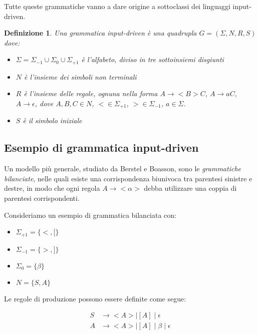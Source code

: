 \documentclass[a4paper,12pt]{report}
\newtheorem{definition}{Definizione}[chapter]
\theoremstyle{propositionstyle}
\begin{document}
    Tutte queste grammatiche vanno a dare origine a sottoclassi dei linguaggi input-driven.

    \begin{definition}
        Una grammatica input-driven è una quadrupla $G = \left(\Sigma, N, R, S\right)$ dove:
        \begin{itemize}
            \item $\Sigma = \Sigma_{-1} \cup \Sigma_0 \cup \Sigma_{+1}$ è l'alfabeto, diviso in tre sottoinsiemi disgiunti
            \item $N$ è l'insieme dei simboli non terminali
            \item $R$ è l'insieme delle regole, ognuna nella forma $A \rightarrow <B>C$, $A \rightarrow aC$, $A \rightarrow \epsilon$, dove $A, B, C \in N$, $< \in \Sigma_{+1}$, $> \in \Sigma_{-1}$, $a \in \Sigma$.
            \item $S$ è il simbolo iniziale
        \end{itemize}
    \end{definition}

    \subsection{Esempio di grammatica input-driven}
    
    Un modello più generale, studiato da Berstel e Boasson, sono le \textit{grammatiche bilanciate}, nelle quali esiste una corrispondenza biunivoca tra parentesi sinistre e destre, in modo che ogni regola $A \rightarrow <\alpha>$ debba utilizzare una coppia di parentesi corrispondenti.
    
    Consideriamo un esempio di grammatica bilanciata con:
    \begin{itemize}
        \item $\Sigma_{+1} = \{<, [\}$
        \item $\Sigma_{-1} = \{>, ]\}$
        \item $\Sigma_0 = \{\beta\}$
        \item $N = \{S, A\}$
    \end{itemize}
    
    Le regole di produzione possono essere definite come segue:
    
    \begin{align}
        S &\rightarrow < A > \mid [A] \mid \epsilon \\
        A &\rightarrow < A > \mid [A] \mid \beta \mid \epsilon
    \end{align}
    
\end{document}
